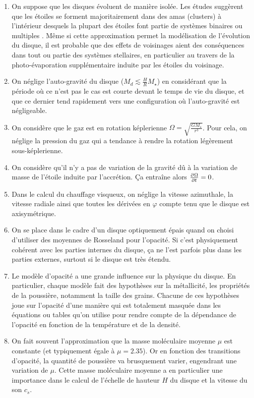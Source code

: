 \begin{enumerate}
\item On suppose que les disques évoluent de manière isolée. Les études suggèrent que les étoiles se forment majoritairement dans des amas (clusters) à l'intérieur desquels la plupart des étoiles font partie de systèmes binaires ou multiples \citep{duquennoy1991multiplicity}. Même si cette approximation permet la modélisation de l'évolution du disque, il est probable que des effets de voisinages aient des conséquences dans tout ou partie des systèmes stellaires, en particulier au travers de la photo-évaporation supplémentaire induite par les étoiles du voisinage.
\item On néglige l'auto-gravité du disque ($M_d \lesssim \frac{H}{R}M_\star$) en considérant que la période où ce n'est pas le cas est courte devant le temps de vie du disque, et que ce dernier tend rapidement vers une configuration où l'auto-gravité est négligeable.
\item On considère que le gaz est en rotation képlerienne $\Omega=\sqrt{\frac{GM_\star}{r^3}}$. Pour cela, on néglige la pression du gaz qui a tendance à rendre la rotation légèrement sous-képlerienne.
\item On considère qu'il n'y a pas de variation de la gravité dû à la variation de masse de l'étoile induite par l'accrétion. Ça entraîne alors $\pd{\Omega}{t} = 0$.
\item Dans le calcul du chauffage visqueux, on néglige la vitesse azimuthale, la vitesse radiale ainsi que toutes les dérivées en $\varphi$ compte tenu que le disque est axisymétrique.
\item On se place dans le cadre d'un disque optiquement épais quand on choisi d'utiliser des moyennes de Rosseland pour l'opacité. Si c'est physiquement cohérent avec les parties internes du disque, ça ne l'est parfois plus dans les parties externes, surtout si le disque est très étendu.
\item Le modèle d'opacité a une grande influence sur la physique du disque. En particulier, chaque modèle fait des hypothèses sur la métallicité, les propriétés de la poussière, notamment la taille des grains. Chacune de ces hypothèses joue sur l'opacité d'une manière qui est totalement masquée dans les équations ou tables qu'on utilise pour rendre compte de la dépendance de l'opacité en fonction de la température et de la densité.
\item On fait souvent l'approximation que la masse moléculaire moyenne $\mu$ est constante (et typiquement égale à $\mu=2.35$). Or en fonction des transitions d'opacité, la quantité de poussière va brusquement varier, engendrant une variation de $\mu$. Cette masse moléculaire moyenne a en particulier une importance dans le calcul de l'échelle de hauteur $H$ du disque et la vitesse du son $c_s$. 

\end{enumerate}
